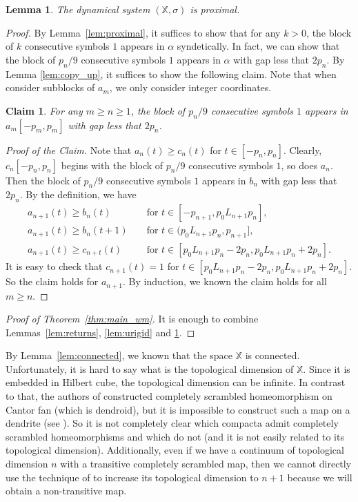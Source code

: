 \documentclass[reqno,a4paper,12pt]{amsart}
\newtheorem{lem}[thm]{Lemma}
\newtheorem*{claim}{Claim}
\theoremstyle{definition}
\numberwithin{equation}{section}
\begin{document}
\begin{lem}\label{lem:4.10}
The dynamical system $(\mathbb{X},\sigma)$ is proximal.
\end{lem}
\begin{proof}
By Lemma~\ref{lem:proximal}, it suffices to show that for any $k>0$,
the block of $k$ consecutive symbols $1$ appears in $\alpha$ syndetically.
In fact, we can show that the block of $p_n/9$ consecutive symbols $1$ appears in $\alpha$ with gap less that $2p_n$.
By Lemma \ref{lem:copy_up}, it suffices to show the following claim.
Note that when consider subblocks of $a_m$, we only consider integer coordinates.
\begin{claim}
For any $m\geq n\geq 1$,
the block of $p_n/9$ consecutive symbols $1$ appears in $a_m[-p_m,p_m]$  with gap less that $2p_n$.
\end{claim}
\noindent\textit{Proof of the Claim.}
Note that $a_n(t)\geq c_n(t)$ for $t\in[-p_n,p_n]$.
Clearly, $c_n[-p_n,p_n]$ begins
with the block of $p_n/9$ consecutive symbols $1$, so does $a_n$.
Then the block of $p_n/9$ consecutive symbols $1$ appears in $b_n$ with gap less that $2p_n$.
By the definition, we have
\begin{eqnarray*}
a_{n+1}(t)\geq b_n(t)&&\text{ for } t\in[-p_{n+1},p_0L_{n+1}p_n],\\
a_{n+1}(t)\geq b_n(t+1)&& \text{ for }t\in(p_0L_{n+1}p_n,p_{n+1}],\\
a_{n+1}(t)\geq c_{n+t}(t)&&\text{ for }t\in [p_0L_{n+1}p_n-2p_n, p_0L_{n+1}p_n+2p_n].
\end{eqnarray*}
It is easy to check that $c_{n+1}(t)=1$ for $t\in [p_0L_{n+1}p_n-2p_n, p_0L_{n+1}p_n+2p_n]$.
So the claim holds for $a_{n+1}$.
By induction, we known the claim holds for all $m\geq n$.
\end{proof}

\begin{proof}[Proof of Theorem~\ref{thm:main_wm}]
It is enough to combine Lemmas~\ref{lem:returns}, \ref{lem:urigid} and \ref{lem:4.10}.
\end{proof}

By Lemma~\ref{lem:connected}, we known that the space $\mathbb{X}$ is connected.
Unfortunately, it is hard to say what is the topological dimension of $\mathbb{X}$.
Since it is embedded in Hilbert cube, the topological dimension can be infinite.
In contrast to that, the authors of \cite{HYCS}
constructed completely scrambled homeomorphism on Cantor fan (which is dendroid), but
it is impossible to construct such a map on a dendrite (see \cite[Corollary~1.2]{IN}). So it is not completely clear which compacta admit
completely scrambled homeomorphisms and which do not
(and it is not easily related to its topological dimension).
Additionally, even if we have
a continuum of topological dimension $n$ with a transitive completely scrambled map,
then we cannot directly use the technique of \cite{HYCS} to increase
its topological dimension to $n+1$ because we will obtain a non-transitive map.
\end{document}
